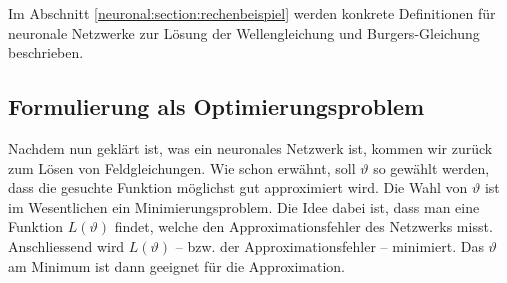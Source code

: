 Im Abschnitt \ref{neuronal:section:rechenbeispiel} werden konkrete Definitionen für neuronale Netzwerke zur Lösung der Wellengleichung und Burgers-Gleichung beschrieben.


\subsection{Formulierung als Optimierungsproblem}\label{neuronal:subsection:optimierungsproblem}
Nachdem nun geklärt ist, was ein neuronales Netzwerk ist, kommen wir zurück zum Lösen von Feldgleichungen.
Wie schon erwähnt, soll $\vartheta$ so gewählt werden, dass die gesuchte Funktion möglichst gut approximiert wird.
Die Wahl von $\vartheta$ ist im Wesentlichen ein Minimierungsproblem.
Die Idee dabei ist, dass man eine Funktion \( L(\vartheta) \) findet, welche den Approximationsfehler des Netzwerks misst.
Anschliessend wird $L(\vartheta)$ -- bzw. der Approximationsfehler -- minimiert.
Das $\vartheta$ am Minimum ist dann geeignet für die Approximation.

